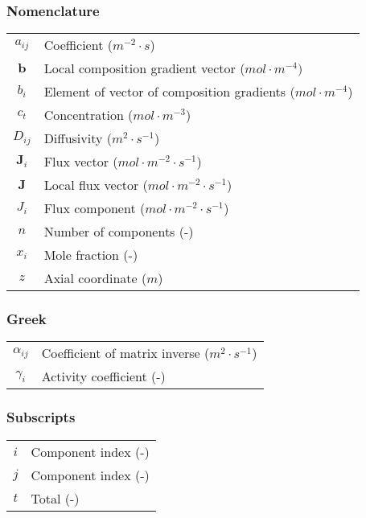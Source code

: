 \documentclass[11]{Report}
\begin{document}
\subsubsection*{Nomenclature}
\begin{table}[H]
    \begin{tabular}{c l}  
      $a_{ij}$ & Coefficient ($ m^{-2} \cdot s $) \\     
      $\textbf{b}$ & Local composition gradient vector ($ mol \cdot m^{-4})$ \\ 
      $b_i$ & Element of vector of composition gradients ($mol \cdot m^{-4}$)\\    
      $c_t$ & Concentration ($mol \cdot m^{-3}$) \\
      $D_{ij}$ & Diffusivity ($m^2 \cdot s^{-1}$) \\
      $\textbf{J}_i$ & Flux vector ($mol \cdot m^{-2} \cdot s^{-1}$) \\
      $\textbf{J}$ & Local flux vector ($mol \cdot m^{-2} \cdot s^{-1}$) \\
      $J_i$ & Flux component ($mol \cdot m^{-2} \cdot s^{-1}$) \\          
      $n$ & Number of components (-) \\
      $x_i$ & Mole fraction (-)\\
      $z$ & Axial coordinate ($m$) \\
    \end{tabular}
\end{table}
\subsubsection*{Greek}
\begin{table}[H]
    \begin{tabular}{c l} 
      $\alpha_{ij}$ & Coefficient of matrix inverse ($m^2 \cdot s^{-1}$) \\
      $\gamma_i$ & Activity coefficient (-) \\
    \end{tabular}
\end{table}
\subsubsection*{Subscripts}
\begin{table}[H]
    \begin{tabular}{c l}
      $i$ & Component index (-)\\
      $j$ & Component index (-) \\
      $t$ & Total (-) \\
    \end{tabular}
\end{table}
\end{document}
